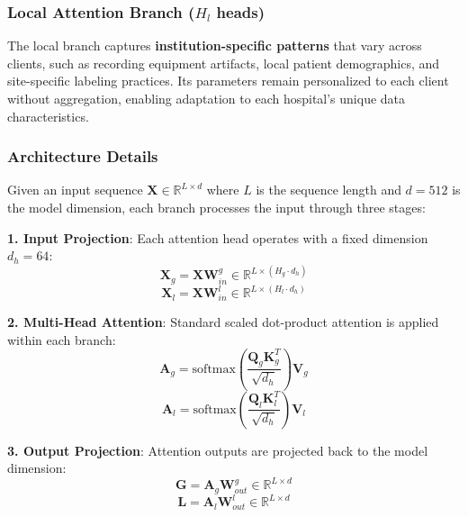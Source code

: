 \subsubsection{Local Attention Branch ($H_l$ heads)}
The local branch captures \textbf{institution-specific patterns} that vary across clients, such as recording equipment artifacts, local patient demographics, and site-specific labeling practices. Its parameters remain personalized to each client without aggregation, enabling adaptation to each hospital's unique data characteristics.

\subsubsection{Architecture Details}

Given an input sequence $\mathbf{X} \in \mathbb{R}^{L \times d}$ where $L$ is the sequence length and $d = 512$ is the model dimension, each branch processes the input through three stages:

\textbf{1. Input Projection}: Each attention head operates with a fixed dimension $d_h = 64$:
\begin{equation}
\mathbf{X}_g = \mathbf{X} \mathbf{W}_{in}^g \in \mathbb{R}^{L \times (H_g \cdot d_h)}
\end{equation}
\begin{equation}
\mathbf{X}_l = \mathbf{X} \mathbf{W}_{in}^l \in \mathbb{R}^{L \times (H_l \cdot d_h)}
\end{equation}

\textbf{2. Multi-Head Attention}: Standard scaled dot-product attention is applied within each branch:
\begin{equation}
\mathbf{A}_g = \text{softmax}\left(\frac{\mathbf{Q}_g \mathbf{K}_g^T}{\sqrt{d_h}}\right) \mathbf{V}_g
\end{equation}
\begin{equation}
\mathbf{A}_l = \text{softmax}\left(\frac{\mathbf{Q}_l \mathbf{K}_l^T}{\sqrt{d_h}}\right) \mathbf{V}_l
\end{equation}

\textbf{3. Output Projection}: Attention outputs are projected back to the model dimension:
\begin{equation}
\mathbf{G} = \mathbf{A}_g \mathbf{W}_{out}^g \in \mathbb{R}^{L \times d}
\end{equation}
\begin{equation}
\mathbf{L} = \mathbf{A}_l \mathbf{W}_{out}^l \in \mathbb{R}^{L \times d}
\end{equation}


